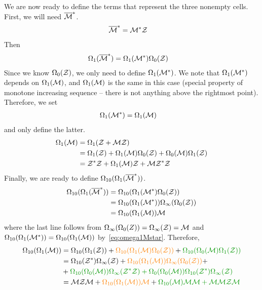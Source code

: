 \documentclass[12pt, a4paper, twoside]{report}
\begin{document}
We are now ready to define the terms that represent the three nonempty cells. First, we will need $\overline{\mathcal{M}}^*$. 
\begin{align}
  \overline{\mathcal{M}}^* &= \mathcal{M}^*\mathcal{Z}
\end{align}
Then
\begin{align}
  \Omega_1(\overline{\mathcal{M}}^*) &= \Omega_1(\mathcal{M}^*)\Omega_0(\mathcal{Z})
\end{align}
Since we know $\Omega_0(\mathcal{Z})$, we only need to define $\Omega_1(\mathcal{M}^*)$. We note that $\Omega_1(\mathcal{M}^*)$ depends on $\Omega_1(\mathcal{M})$, and $\Omega_1(\mathcal{M})$ is the same in this case (special property of monotone increasing sequence -- there is not anything above the rightmost point). Therefore, we set
\begin{align}
\Omega_1(\mathcal{M}^*) &= \Omega_1(\mathcal{M})
\label{eq:omega1Mstar}
\end{align}
and only define the latter. 
\begin{align}
  \begin{aligned}
    \Omega_1(\mathcal{M}) &= \Omega_1(\mathcal{Z} + \mathcal{M}\mathcal{Z})\\
    &= \Omega_1(\mathcal{Z}) + \Omega_1(\mathcal{M})\Omega_0(\mathcal{Z}) + \Omega_0(\mathcal{M})\Omega_1(\mathcal{Z})\\
    &= \mathcal{Z}^*\mathcal{Z} + \Omega_1(\mathcal{M})\mathcal{Z} + \mathcal{M}\mathcal{Z}^*\mathcal{Z}
  \end{aligned}
\end{align}
Finally, we are ready to define $\Omega_{10}(\Omega_1(\overline{\mathcal{M}}^*))$. 
\begin{align}
  \Omega_{10}(\Omega_1(\overline{\mathcal{M}}^*)) &= \Omega_{10}(\Omega_1(\mathcal{M}^*)\Omega_0(\mathcal{Z}))\\
                                   &= \Omega_{10}(\Omega_1(\mathcal{M}^*))\Omega_\infty(\Omega_0(\mathcal{Z}))\\
                                   &= \Omega_{10}(\Omega_1(\mathcal{M}))\mathcal{M}
\end{align}
where the last line follows from $\Omega_\infty(\Omega_0(Z)) = \Omega_\infty(\mathcal{Z}) = \mathcal{M}$ and $\Omega_{10}(\Omega_1(\mathcal{M}^*)) = \Omega_{10}(\Omega_1(\mathcal{M}))$ by~\eqref{eq:omega1Mstar}. Therefore,
\begin{align}
  \begin{aligned}
    \Omega_{10}(\Omega_1(\M)) &= \Omega_{10}(\Omega_1(\Z)) + \textcolor{orange}{\Omega_{10}(\Omega_1(\M)\Omega_0(\Z))} + \textcolor{green}{\Omega_{10}(\Omega_0(\M)\Omega_1(\Z))}\\
    &= \Omega_{10}(\Zstar)\Omega_\infty(\Z) + \textcolor{orange}{\Omega_{10}(\Omega_1(\M))\Omega_\infty(\Omega_0(\Z))} +\\
    &+ \textcolor{green}{\Omega_{10}(\Omega_0(\M))\Omega_\infty(\Zstar\Z) + \Omega_0(\Omega_0(\M))\Omega_{10}(\Zstar)\Omega_\infty(\Z)}\\
    &= \M\Z\M + \textcolor{orange}{\Omega_{10}(\Omega_1(\M))\M} + \textcolor{green}{\Omega_{10}(\M)\M\M + \M\M\Z\M}
  \end{aligned}
      \label{eq:mmm_omega101M}
\end{align}
\end{document}
